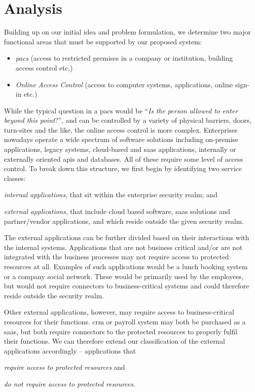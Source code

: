 \section{Analysis}\label{sec:analysis}

Building up on our initial idea and problem formulation, we determine two major functional areas that must be supported by our proposed system:

\begin{itemize}[noitemsep]
    \item \textit{\acrfull{pacs}} (access to restricted premises in a company or institution, building access control etc.)
    \item \textit{Online Access Control} (access to computer systems, applications, online sign-in etc.)
\end{itemize}

While the  typical question in a \acrshort{pacs} would be ``\textit{Is the person allowed to enter beyond this point}?'', and can be controlled by a variety of physical barriers, doors, turn-sites and the like, the online access control is more complex. Enterprises nowadays operate a wide spectrum of software solutions including on-premise applications, legacy systems, cloud-based and \acrshort{saas} applications, internally or externally oriented \acrshort{api}s and databases. All of these require some level of access control. To break down this structure, we first begin by identifying two service classes:
\begin{enumerate*}[label=(\roman*)]
    \item \textit{internal applications}, that sit within the enterprise security realm; and 
    \item \textit{external applications}, that include cloud based software, \acrshort{saas} solutions and partner/vendor applications, and which reside outside the given security realm.
\end{enumerate*}

The external applications can be further divided based on their interactions with the internal systems. Applications that are not business critical and/or are not integrated with the business processes may not require access to protected resources at all. Examples of such applications would be a lunch booking system or a company social network. These would be primarily used by the employees, but would not require connectors to business-critical systems and could therefore reside outside the security realm.

Other external applications, however, may require access to business-critical resources for their functions. \acrlong{crm} or payroll system may both be purchased as a \acrshort{saas}, but both require connectors to the protected resources to properly fulfil their functions. We can therefore extend our classification of the external applications accordingly -- applications that
\begin{enumerate*}[label=(\roman*)]
    \item \textit{require access to protected resources} and
    \item \textit{do not require access to protected resources}.
\end{enumerate*}

